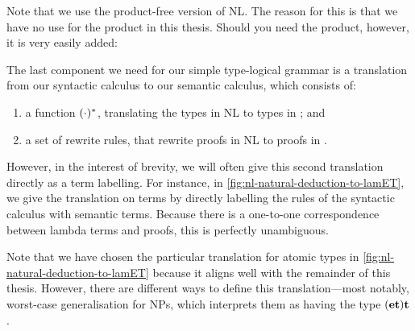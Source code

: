 Note that we use the product-free version of NL. The reason for this
is that we have no use for the product in this thesis. Should you need
the product, however, it is very easily added:
\begin{center}
  \begin{pfbox}
  \end{pfbox}
  \begin{pfbox}
  \end{pfbox}
\end{center}

The last component we need for our simple type-logical grammar is a
translation from our syntactic calculus to our semantic calculus,
which consists of:
\begin{enumerate}[label=(\arabic*)]
\item
  a function $({\cdot})^*$, translating the types in NL to types in \lamET; and
\item
  a set of rewrite rules, that rewrite proofs in NL to proofs in \lamET.
\end{enumerate}
However, in the interest of brevity, we will often give this second
translation directly as a term labelling. For instance, in
\autoref{fig:nl-natural-deduction-to-lamET}, we give the
translation on terms by directly labelling the rules of the syntactic
calculus with semantic terms. Because there is a one-to-one
correspondence between lambda terms and proofs, this is perfectly
unambiguous.

Note that we have chosen the particular translation for atomic types
in \autoref{fig:nl-natural-deduction-to-lamET} because it
aligns well with the remainder of this thesis. However, there are
different ways to define this translation---most notably,
 worst-case generalisation for NPs, which
interprets them as having the type $(\mathbf{e}\mathbf{t})\mathbf{t}$.

